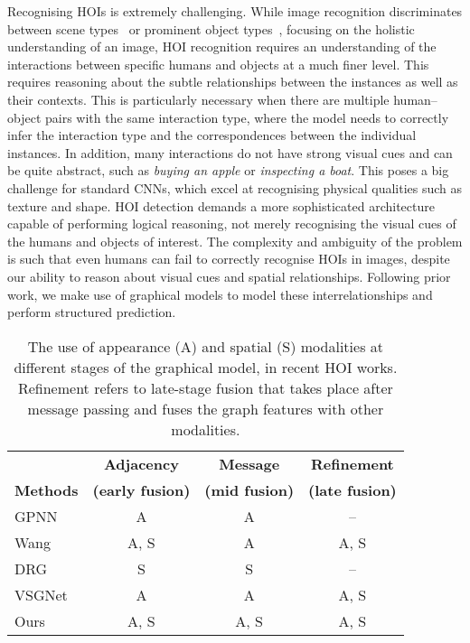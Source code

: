 \documentclass[10pt,twocolumn,letterpaper]{article}
\begin{document}
Recognising HOIs is extremely challenging. While image recognition discriminates between scene types~\cite{zhou2017} or prominent object types~\cite{russ2015}, focusing on the holistic understanding of an image, HOI recognition requires an understanding of the interactions between specific humans and objects at a much finer level. This requires reasoning about the subtle relationships between the instances as well as their contexts. This is particularly necessary when there are multiple human--object pairs with the same interaction type, where the model needs to correctly infer the interaction type and the correspondences between the individual instances.
In addition, many interactions do not have strong visual cues and can be quite abstract, such as \textit{buying an apple} or \textit{inspecting a boat}. This poses a big challenge for standard CNNs, which excel at recognising physical qualities such as texture and shape. HOI detection demands a more sophisticated architecture capable of performing logical reasoning, not merely recognising the visual cues of the humans and objects of interest. The complexity and ambiguity of the problem is such that even humans can fail to correctly recognise HOIs in images, despite our ability to reason about visual cues and spatial relationships. Following prior work, we make use of graphical models to model these interrelationships and perform structured prediction.

\begin{table}[t]\small
	\caption{The use of appearance (A) and spatial (S) modalities at different stages of the graphical model, in recent HOI works. Refinement refers to late-stage fusion that takes place after message passing and fuses the graph features with other modalities.}
	\label{tab:modalities}
\setlength{\tabcolsep}{1pt} \begin{tabularx}{\linewidth}{l C C C}
		\toprule
		& \textbf{Adjacency} & \textbf{Message} & \textbf{Refinement}\\
		\textbf{Methods} & \textbf{(early fusion)} & \textbf{(mid fusion)} & \textbf{(late fusion)}\\
		\midrule
		GPNN~\cite{qi2018} & A & A & -- \\
		Wang \etal~\cite{wang2020} & A, S & A & A, S \\
		DRG~\cite{gao2020} & S & S & -- \\
		VSGNet~\cite{ulutan2020} & A & A & A, S \\
		Ours & A, S & A, S & A, S \\
		\bottomrule
	\end{tabularx}
\end{table}
\end{document}
